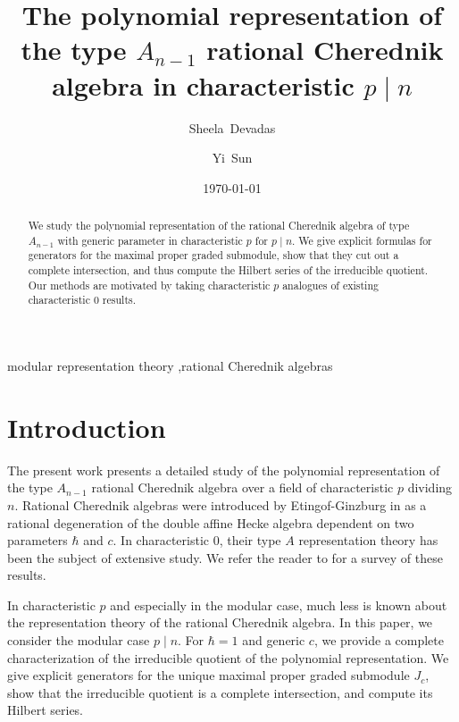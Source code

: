 \documentclass{elsarticle}
\numberwithin{equation}{section}
\theoremstyle{definition}
\begin{document}
\title{The polynomial representation of the type $A_{n - 1}$ rational Cherednik algebra in characteristic $p \mid n$}
\author[stan]{Sheela~Devadas}
\author[mit]{Yi~Sun}
\address[stan]{Stanford University, 450 Serra Mall, Stanford, CA 94305}
\address[mit]{Massachusetts Institute of Technology, 77 Massachusetts Ave., Cambridge MA 02139}
\date{\today}

\begin{abstract}
We study the polynomial representation of the rational Cherednik algebra of type $A_{n-1}$ with generic parameter in characteristic $p$ for $p \mid n$. We give explicit formulas for generators for the maximal proper graded submodule, show that they cut out a complete intersection, and thus compute the Hilbert series of the irreducible quotient. Our methods are motivated by taking characteristic $p$ analogues of existing characteristic $0$ results.
\end{abstract}
\begin{keyword}
modular representation theory \sep rational Cherednik algebras 
\end{keyword}

\maketitle

\setcounter{tocdepth}{1}
\tableofcontents

\section{Introduction}

The present work presents a detailed study of the polynomial representation of the type $A_{n - 1}$ rational Cherednik algebra over a field of characteristic $p$ dividing $n$.  Rational Cherednik algebras were introduced by Etingof-Ginzburg in \cite{EG} as a rational degeneration of the double affine Hecke algebra dependent on two parameters $\hbar$ and $c$.  In characteristic $0$, their type $A$ representation theory has been the subject of extensive study.  We refer the reader to \cite{EM} for a survey of these results. 

In characteristic $p$ and especially in the modular case, much less is known about the representation theory of the rational Cherednik algebra.  In this paper, we consider the modular case $p \mid n$.  For $\hbar = 1$ and generic $c$, we provide a complete characterization of the irreducible quotient of the polynomial representation.  We give explicit generators for the unique maximal proper graded submodule $J_c$, show that the irreducible quotient is a complete intersection, and compute its Hilbert series.
\end{document}
